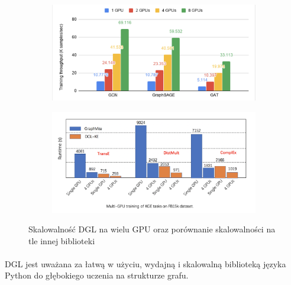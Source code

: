 \documentclass{article}
\begin{document}
\begin{figure}
\centering
\begin{subfigure}{.5\textwidth}
  \centering
  \includegraphics[width=0.9\linewidth]{images/one-four-GPUs.png}
  \label{fig:sub1}
\end{subfigure}%
\begin{subfigure}{.5\textwidth}
  \centering
  \includegraphics[width=0.9\linewidth]{images/one-four-GPUs-DGLvsGraphVite.png}
  \label{fig:sub2}
\end{subfigure}
\caption{Skalowalność DGL na wielu GPU oraz porównanie skalowalności na tle innej biblioteki}
\label{fig:test}
\end{figure}

\paragraph{}
DGL jest uważana za łatwą w użyciu, wydajną i skalowalną biblioteką języka Python do głębokiego uczenia na strukturze grafu.
\end{document}
